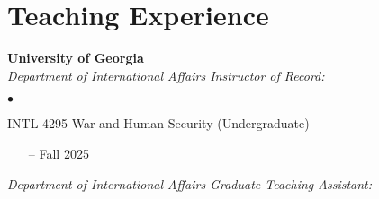 \documentclass[letterpaper,12pt]{article}
\newenvironment{list2}{
  \begin{list}{$\bullet$}{%
      \setlength{\itemsep}{0in}
      \setlength{\parsep}{0in} 
      \setlength{\parskip}{0in}
      \setlength{\topsep}{0in} 
      \setlength{\partopsep}{0in}
      \setlength{\leftmargin}{1in}
      \setlength{\labelsep}{1em}
      \setlength{\labelwidth}{1em}
      \setlength{\itemindent}{-2em}
      \setlength{\listparindent}{2em}}}{\end{list}}
\begin{document}
\section{Teaching Experience}
\textbf{University of Georgia}\\
\textit{Department of International Affairs Instructor of Record:}
\begin{list2}
    \item INTL 4295 War and Human Security (Undergraduate)
            \begin{enumerate}[leftmargin=!,labelindent=0pt,itemindent=-15pt]
                \item[--] Fall 2025
            \end{enumerate}
\end{list2}
\par
\textit{Department of International Affairs Graduate Teaching Assistant:}
\end{document}
